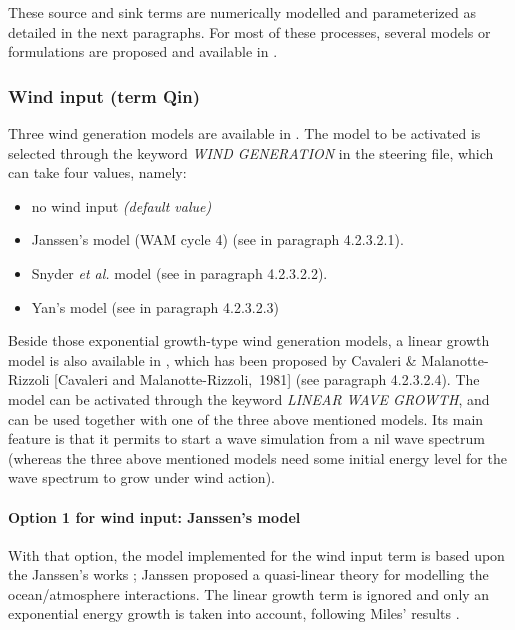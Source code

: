 These source and sink terms are numerically modelled and parameterized as detailed in the next paragraphs. For most of these processes, several models or formulations are proposed and available in \tomawac.


\subsubsection{ Wind input (term Qin)}

 Three wind generation models are available in \tomawac. The model to be activated is selected through the keyword \textit{WIND GENERATION} in the steering file, which can take four values, namely:

\begin{itemize}
\item  no wind input \textit{(default value)}
\item  Janssen's model \cite{Janssen1989} \cite{Janssen1991} (WAM cycle 4) (see in paragraph 4.2.3.2.1).
\item  Snyder \textit{et al. }model \cite{Snyder1981} (see in paragraph 4.2.3.2.2).
\item  Yan's model \cite{Yan1987} (see in paragraph 4.2.3.2.3)
\end{itemize}

 Beside those exponential growth-type wind generation models, a linear growth model is also available in \tomawac, which has been proposed by Cavaleri \& Malanotte-Rizzoli [Cavaleri and Malanotte-Rizzoli,~1981] (see paragraph 4.2.3.2.4). The model can be activated through the keyword \textit{LINEAR WAVE GROWTH}, and can be used together with one of the three above mentioned models. Its main feature is that it permits to start a wave simulation from a nil wave spectrum (whereas the three above mentioned models need some initial energy level for the wave spectrum to grow under wind action).


  \paragraph{Option 1 for wind input: Janssen's model}

 With that option, the model implemented for the wind input term is based upon the Janssen's works \cite{Janssen1989} \cite{Janssen1991}; Janssen proposed a quasi-linear theory for modelling the ocean/atmosphere interactions. The linear growth term is ignored and only an exponential energy growth is taken into account, following Miles' results \cite{Miles1957}.

